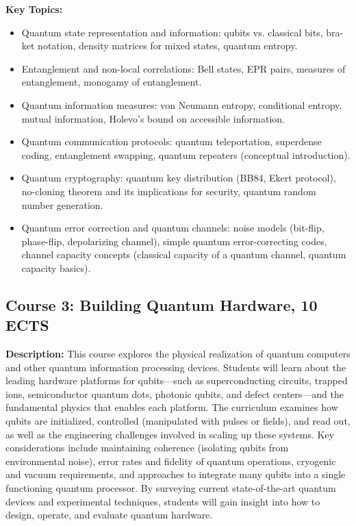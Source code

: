 \documentclass{scrreprt}
\begin{document}
\textbf{Key Topics:}
\begin{itemize}
\item Quantum state representation and information: qubits vs. classical bits, bra-ket notation, density matrices for mixed states, quantum entropy.
\item Entanglement and non-local correlations: Bell states, EPR pairs, measures of entanglement, monogamy of entanglement.
\item Quantum information measures: von Neumann entropy, conditional entropy, mutual information, Holevo’s bound on accessible information.
\item Quantum communication protocols: quantum teleportation, superdense coding, entanglement swapping, quantum repeaters (conceptual introduction).
\item Quantum cryptography: quantum key distribution (BB84, Ekert protocol), no-cloning theorem and its implications for security, quantum random number generation.
\item Quantum error correction and quantum channels: noise models (bit-flip, phase-flip, depolarizing channel), simple quantum error-correcting codes, channel capacity concepts (classical capacity of a quantum channel, quantum capacity basics).
\end{itemize}

\subsection{Course 3: Building Quantum Hardware, 10 ECTS}

\textbf{Description:} This course explores the physical realization of
quantum computers and other quantum information processing
devices. Students will learn about the leading hardware platforms for
qubits—such as superconducting circuits, trapped ions, semiconductor
quantum dots, photonic qubits, and defect centers—and the fundamental
physics that enables each platform. The curriculum examines how qubits
are initialized, controlled (manipulated with pulses or fields), and
read out, as well as the engineering challenges involved in scaling up
these systems. Key considerations include maintaining coherence
(isolating qubits from environmental noise), error rates and fidelity
of quantum operations, cryogenic and vacuum requirements, and
approaches to integrate many qubits into a single functioning quantum
processor. By surveying current state-of-the-art quantum devices and
experimental techniques, students will gain insight into how to
design, operate, and evaluate quantum hardware.
\end{document}
